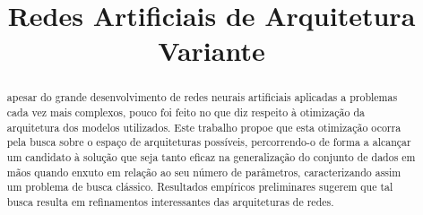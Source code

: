 \documentclass[twoside,conference,a4paper,12px]{IEEEtran}
\begin{document}
\renewcommand{\IEEEkeywordsname}{Palavras-chave}


\title{Redes Artificiais de Arquitetura Variante}
\author{%
}

\maketitle

\begin{abstract}

apesar do grande desenvolvimento de redes neurais artificiais aplicadas a problemas cada vez mais complexos, pouco foi feito no que diz respeito à otimização da arquitetura dos modelos utilizados. Este trabalho propoe que esta otimização ocorra pela busca sobre o espaço de arquiteturas possíveis, percorrendo-o de forma a alcançar um candidato à solução que seja tanto eficaz na generalização do conjunto de dados em mãos quando enxuto em relação ao seu número de parâmetros, caracterizando assim um problema de busca clássico. Resultados empíricos preliminares sugerem que tal busca resulta em refinamentos interessantes das arquiteturas de redes.

\end{abstract}
\end{document}
